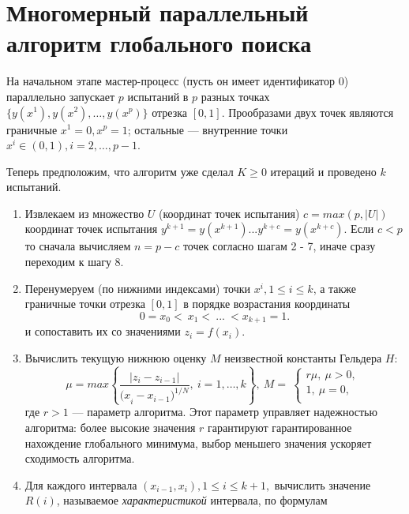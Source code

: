 \documentclass[runningheads]{llncs}
\begin{document}
\section{Многомерный параллельный алгоритм глобального поиска}\label{SecGSA}

На начальном этапе мастер-процесс (пусть он имеет идентификатор $0$) параллельно запускает $p$ испытаний в $p$ разных точках $\{y\left(x^1\right),y\left(x^2\right),\ldots,y\left(x^p\right)\}$ отрезка $[0,1]$.
Прообразами двух точек являются граничные $x^1=0,x^p=1$; остальные — внутренние точки $x^i\in\left(0,1\right),i=2,\ldots,p-1$.

Теперь предположим, что алгоритм уже сделал $K\geq0$ итераций и проведено $k$ испытаний.


\begin{enumerate}
	
	\item Извлекаем из множество $U$ (координат точек испытания) $c = max(p, |U|)$ координат точек испытания $y^{k+1}=y\left(x^{k+1}\right) ... y^{k+c}=y\left(x^{k+c}\right)$. Если $c < p$ то сначала вычисляем $n = p - c$ точек согласно шагам 2 - 7, иначе сразу переходим к шагу 8.	
	
	\item Перенумеруем (по нижними индексами) точки $x^i, 1\leq i\leq k$, а также граничные точки отрезка $[0,1]$ в порядке возрастания координаты  
	\begin{equation} 
		\label{agp1_sort} 	0=x_0<\ x_1<\ ...\ <x_{k+1}=1. 	
	\end{equation} 
	и сопоставить их со значениями $z_i=f(x_i)$. 
	
	\item  Вычислить текущую нижнюю оценку $M$ неизвестной константы Гельдера $H$: 
	\begin{equation} 
		\label{agp2_mu} 	\mu=max\left\{\frac{|z_i-z_{i-1}|}{{{(x}_i-x_{i-1})}^{1/N}},\ i=1,\ldots,k\right\},\ M=\  \left\{\begin{matrix}r\mu,\ \mu>0,\\1,\ \mu=0,\\\end{matrix}\right.\ 	
	\end{equation} 
	где $r>1$ — параметр алгоритма. Этот параметр управляет надежностью алгоритма: более высокие значения $r$ гарантируют гарантированное нахождение глобального минимума, выбор меньшего значения ускоряет сходимость алгоритма.
	
	\item  Для каждого интервала $(x_{i-1},x_i), 1\leq i\leq k+1,$ вычислить значение $R(i)$, называемое \textit{характеристикой} интервала, по формулам
	

\end{enumerate}
\end{document}
